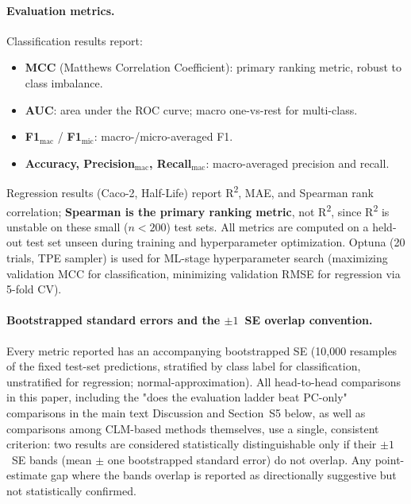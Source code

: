 \documentclass[9pt,a4paper]{article}
\begin{document}
\paragraph{Evaluation metrics.}
Classification results report:
\begin{itemize}[leftmargin=2em]
  \item \textbf{MCC} (Matthews Correlation Coefficient): primary ranking metric,
    robust to class imbalance.
  \item \textbf{AUC}: area under the ROC curve; macro one-vs-rest for multi-class.
  \item \textbf{F1$_\text{mac}$} / \textbf{F1$_\text{mic}$}: macro-/micro-averaged F1.
  \item \textbf{Accuracy, Precision$_\text{mac}$, Recall$_\text{mac}$}:
    macro-averaged precision and recall.
\end{itemize}
Regression results (Caco-2, Half-Life) report R\textsuperscript{2}, MAE, and Spearman
rank correlation; \textbf{Spearman is the primary ranking metric}, not R\textsuperscript{2},
since R\textsuperscript{2} is unstable on these small ($n<200$) test sets.
All metrics are computed on a held-out test set unseen during training and
hyperparameter optimization.
Optuna (20 trials, TPE sampler) is used for ML-stage hyperparameter search
(maximizing validation MCC for classification, minimizing validation RMSE for
regression via 5-fold CV).

\paragraph{Bootstrapped standard errors and the $\pm1$~SE overlap convention.}
Every metric reported has an accompanying bootstrapped SE (10,000 resamples of the fixed test-set predictions, stratified by class label for classification, unstratified for regression; normal-approximation). All head-to-head comparisons in this paper, including the "does the evaluation ladder beat PC-only" comparisons in the main text Discussion and Section~S5 below,
as well as comparisons among CLM-based methods themselves, use a single, consistent
criterion: two results are considered statistically distinguishable only if their
$\pm1$~SE bands (mean $\pm$ one bootstrapped standard error) do not overlap. Any
point-estimate gap where the bands overlap is reported as directionally suggestive
but not statistically confirmed.

\end{document}
